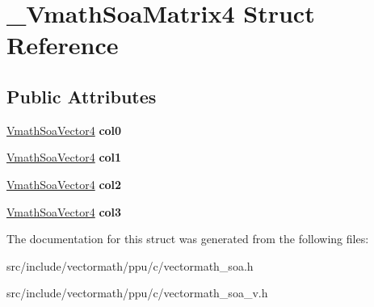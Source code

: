 \hypertarget{struct__VmathSoaMatrix4}{\section{\-\_\-\-Vmath\-Soa\-Matrix4 Struct Reference}
\label{struct__VmathSoaMatrix4}
}
\subsection*{Public Attributes}
\begin{DoxyCompactItemize}
\item 
\hypertarget{struct__VmathSoaMatrix4_ab5f077c52ce7d45792875bc95c8524bb}{\hyperlink{struct__VmathSoaVector4}{Vmath\-Soa\-Vector4} {\bfseries col0}}\label{struct__VmathSoaMatrix4_ab5f077c52ce7d45792875bc95c8524bb}

\item 
\hypertarget{struct__VmathSoaMatrix4_a8249dac895fb491c40bcf33dcf148013}{\hyperlink{struct__VmathSoaVector4}{Vmath\-Soa\-Vector4} {\bfseries col1}}\label{struct__VmathSoaMatrix4_a8249dac895fb491c40bcf33dcf148013}

\item 
\hypertarget{struct__VmathSoaMatrix4_a8b88a96b54598781ebc9db1ad6a02ea5}{\hyperlink{struct__VmathSoaVector4}{Vmath\-Soa\-Vector4} {\bfseries col2}}\label{struct__VmathSoaMatrix4_a8b88a96b54598781ebc9db1ad6a02ea5}

\item 
\hypertarget{struct__VmathSoaMatrix4_a971f1b8a86dd7a048f51c06a2f6372e6}{\hyperlink{struct__VmathSoaVector4}{Vmath\-Soa\-Vector4} {\bfseries col3}}\label{struct__VmathSoaMatrix4_a971f1b8a86dd7a048f51c06a2f6372e6}

\end{DoxyCompactItemize}


The documentation for this struct was generated from the following files\-:\begin{DoxyCompactItemize}
\item 
src/include/vectormath/ppu/c/vectormath\-\_\-soa.\-h\item 
src/include/vectormath/ppu/c/vectormath\-\_\-soa\-\_\-v.\-h\end{DoxyCompactItemize}
